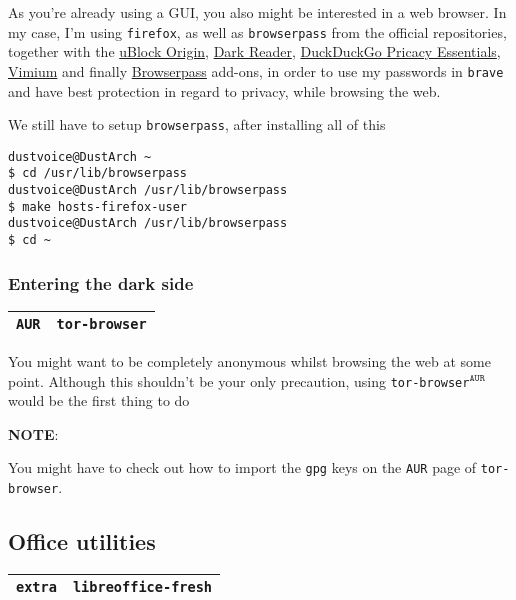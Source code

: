\documentclass[9pt]{report}
\newcommand{\admonition}[2]{\textbf{#1}: {#2}}
\begin{document}
As you’re already using a GUI, you also might be interested in a web browser.
In my case, I’m using \texttt{firefox}, as well as \texttt{browserpass} from the official repositories, together with the \href{https://addons.mozilla.org/en-US/firefox/addon/ublock-origin/}{uBlock Origin}, \href{https://addons.mozilla.org/en-US/firefox/addon/darkreader/}{Dark Reader}, \href{https://addons.mozilla.org/en-US/firefox/addon/duckduckgo-for-firefox/}{DuckDuckGo Pricacy Essentials}, \href{https://addons.mozilla.org/en-US/firefox/addon/vimium-ff/}{Vimium} and finally \href{https://addons.mozilla.org/en-US/firefox/addon/browserpass-ce/}{Browserpass} add-ons, in order to use my passwords in \texttt{brave} and have best protection in regard to privacy, while browsing the web.


We still have to setup \texttt{browserpass}, after installing all of this


\begin{verbatim}
dustvoice@DustArch ~
$ cd /usr/lib/browserpass
dustvoice@DustArch /usr/lib/browserpass
$ make hosts-firefox-user
dustvoice@DustArch /usr/lib/browserpass
$ cd ~
\end{verbatim}


\vfill\eject

\hypertarget{x-entering-the-dark-side}{\subsubsection{Entering the dark side}}
\begin{center}
\begin{tabular}{|c|c|}
\hline
\texttt{AUR} & \texttt{tor-browser} \\ 
\hline
\end{tabular}
\end{center}

You might want to be completely anonymous whilst browsing the web at some point.
Although this shouldn’t be your only precaution, using \texttt{tor-browser}${}^{\texttt{AUR}}$ would be the first thing to do


\admonition{NOTE}{You might have to check out how to import the \texttt{gpg} keys on the \texttt{AUR} page of \texttt{tor-browser}.

}

\vfill\eject

\hypertarget{x-office-utilities}{\subsection{Office utilities}}
\begin{center}
\begin{tabular}{|c|c|}
\hline
\texttt{extra} & \texttt{libreoffice-fresh} \\ 
\hline
\end{tabular}
\end{center}
\end{document}
